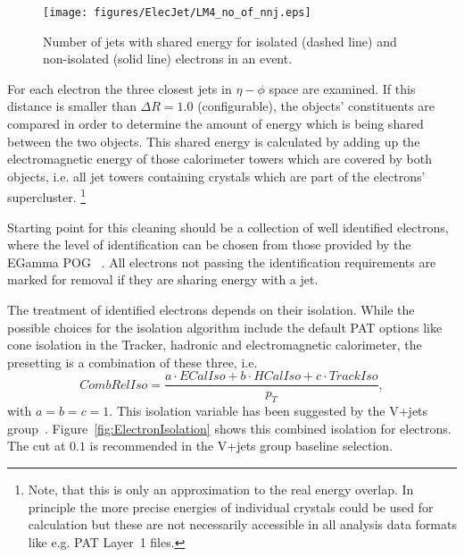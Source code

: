 \documentclass{cmspaper}
\begin{document}
\begin{figure}[hbt]
  \begin{center}
    \texttt{[image: figures/ElecJet/LM4\_no\_of\_nnj.eps]}
    \caption{Number of jets with shared energy for isolated (dashed line) and
    non-isolated (solid line) electrons in an event.}
    \label{fig:NbJets}
  \end{center}
\end{figure}

For each electron the three closest jets in \( \eta-\phi\) space are
examined. If this distance is smaller than $\Delta R=1.0$ (configurable), the
objects' constituents are compared in order to determine the amount of energy
which is being shared between the two objects.
This shared energy is calculated by adding up the electromagnetic energy of
those calorimeter towers which are covered by both objects, i.e. all jet towers
containing crystals which are part of the electrons' supercluster.
\footnote{Note, that this is only an approximation to the real energy overlap.
In principle the more precise energies of individual crystals could be used for
calculation but these are not necessarily accessible in all analysis data
formats like e.g. PAT Layer~1 files.}

Starting point for this cleaning should be a collection of well identified
electrons, where the level of identification can be chosen from those provided
by the EGamma POG ~\cite{elecID}. All electrons not passing the identification
requirements are marked for removal if they are sharing energy with a jet.

The treatment of identified electrons depends on their isolation. While the
possible choices for the isolation algorithm include the default PAT options
like cone isolation in the Tracker, hadronic and electromagnetic calorimeter,
the presetting is a combination of these three, i.e. 
\begin{equation}
    CombRelIso=\frac{a\cdot ECalIso+b\cdot HCalIso+c\cdot TrackIso}{p_T},
    \label{ElIsolation}
\end{equation}
with \(a=b=c=1\). This isolation variable has been suggested by the V+jets
group~\cite{vplusjets}. Figure~\ref{fig:ElectronIsolation} shows this combined
isolation for electrons. The cut at \(0.1\) is recommended in the V+jets
group baseline selection.
\end{document}
